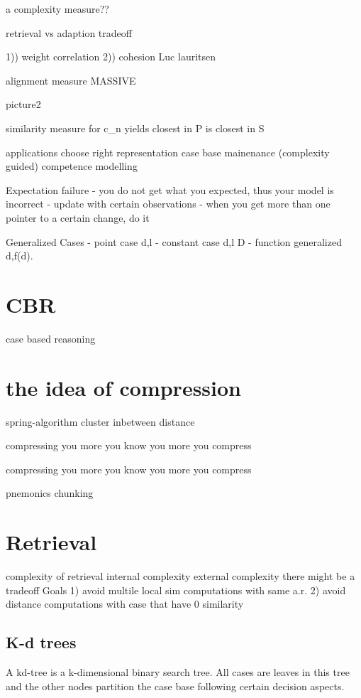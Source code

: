 \documentclass[10pt,oneside,a4paper]{scrartcl}
\begin{document}
a complexity measure??

retrieval vs adaption tradeoff


1)) weight correlation
2)) cohesion           Luc lauritsen


alignment measure MASSIVE

picture2

similarity measure for c_n
yields closest in P is closest in S

applications choose right representation
case base mainenance (complexity guided) competence modelling






Expectation failure
- you do not get what you expected, thus your model is incorrect
- update with certain observations
- when you get more than one pointer to a certain change, do it





Generalized Cases
- point case d,l
- constant case d,l \in D
- function generalized d,f(d).



\section{CBR}
case based reasoning


\section{the idea of compression}
spring-algorithm
cluster inbetween distance

compressing you more you know you more you compress

compressing you more you know you more you compress

pnemonics
chunking
\section{Retrieval}

complexity of retrieval
internal complexity
external complexity   there might be a tradeoff
Goals
1) avoid multile local sim computations with same a.r.
2) avoid distance computations with case that have 0 similarity


\subsection{K-d trees }
A kd-tree is a k-dimensional binary search tree. All cases are leaves in this tree and the other nodes partition the case base following certain decision aspects.
\end{document}
